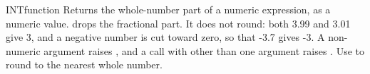 \begin{XbaseEntry}{INT}{function}
Returns the whole-number part of a numeric expression, as a numeric value.
\Syntax
{}
\Usage
{} drops the fractional part. It does not round: both 3.99 and 3.01 give 3, and a negative number is cut toward zero, so that -3.7 gives -3. A non-numeric argument raises , and a call with other than one argument raises .
\Tips
Use  to round to the nearest whole number.
\Examples
{}
\end{XbaseEntry}

